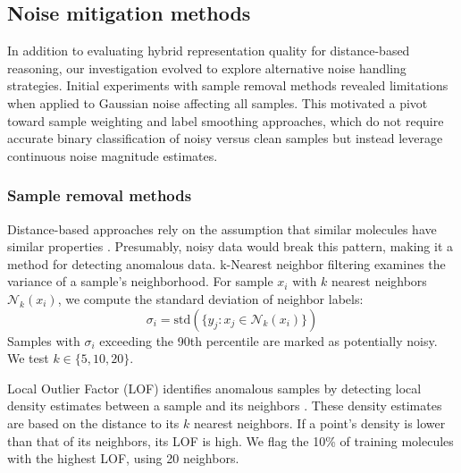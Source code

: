 

\subsection{Noise mitigation methods}

In addition to evaluating hybrid representation quality for distance-based reasoning, our investigation evolved to explore alternative noise handling strategies. Initial experiments with sample removal methods revealed limitations when applied to Gaussian noise affecting all samples. This motivated a pivot toward sample weighting and label smoothing approaches, which do not require accurate binary classification of noisy versus clean samples but instead leverage continuous noise magnitude estimates.

\subsubsection{Sample removal methods}

Distance-based approaches rely on the assumption that similar molecules have similar properties \citep{Cherkasov2014}. Presumably, noisy data would break this pattern, making it a method for detecting anomalous data. k-Nearest neighbor filtering examines the variance of a sample's neighborhood. For sample $x_i$ with $k$ nearest neighbors $\mathcal{N}_k(x_i)$, we compute the standard deviation of neighbor labels:
\begin{equation}
\sigma_i = \text{std}(\{y_j : x_j \in \mathcal{N}_k(x_i)\})
\end{equation}
Samples with $\sigma_i$ exceeding the 90th percentile are marked as potentially noisy. We test $k \in \{5, 10, 20\}$.

Local Outlier Factor (LOF) identifies anomalous samples by detecting local density estimates between a sample and its neighbors \citep{Breunig2000}. These density estimates are based on the distance to its $k$ nearest neighbors. If a point's density is lower than that of its neighbors, its LOF is high. We flag the 10\% of training molecules with the highest LOF, using 20 neighbors. %

